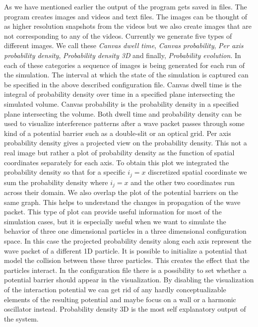 As we have mentioned earlier the output of the program gets saved in files.
The program creates images and videos and text files.
The images can be thought of as higher resolution snapshots from the videos but we also create images that are not corresponding to any of the videos.
Currently we generate five types of different images.
We call these \textit{Canvas dwell time}, \textit{Canvas probability}, \textit{Per axis probability density}, \textit{Probability density 3D} and finally, \textit{Probability evolution}.
In each of these categories a sequence of images is being generated for each run of the simulation.
The interval at which the state of the simulation is captured can be specified in the above described configuration file.
Canvas dwell time is the integral of probability density over time in a specified plane intersecting the simulated volume.
Canvas probability is the probability density in a specified plane intersecting the volume.
Both dwell time and probability density can be used to visualize interference patterns after a wave packet passes through some kind of a potential barrier such as a double-slit or an optical grid.
Per axis probability density gives a projected view on the probability density.
This not a real image but rather a plot of probability density as the function of spatial coordinates separately for each axis.
To obtain this plot we integrated the probability density so that for a specific $i_j = x$ discretized spatial coordinate we sum the probability density where $i_j = x$ and the other two coordinates run across their domain.
We also overlap the plot of the potential barriers on the same graph.
This helps to understand the changes in propagation of the wave packet.
This type of plot can provide useful information for most of the simulation cases, but it is especially useful when we want to simulate the behavior of three one dimensional particles in a three dimensional configuration space.
In this case the projected probability density along each axis represent the wave packet of a different 1D particle.
It is possible to initialize a potential that model the collision between these three particles.
This creates the effect that the particles interact.
In the configuration file there is a possibility to set whether a potential barrier should appear in the visualization.
By disabling the visualization of the interaction potential we can get rid of any hardly conceptualizable elements of the resulting potential and maybe focus on a wall or a harmonic oscillator instead.
Probability density 3D is the most self explanatory output of the system.
